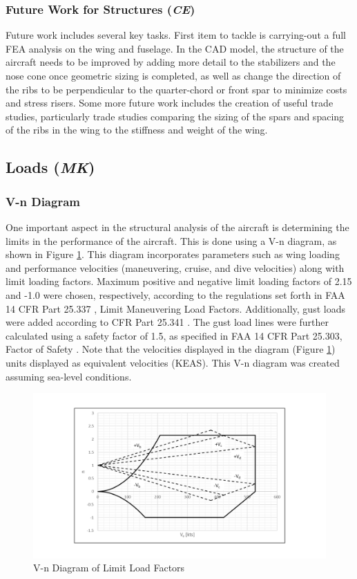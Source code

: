 \subsubsection{Future Work for Structures (\textit{CE})}
Future work includes several key tasks. First item to tackle is carrying-out a full FEA analysis on the wing and fuselage. In the CAD model, the structure of the aircraft needs to be improved by adding more detail to the stabilizers and the nose cone once geometric sizing is completed, as well as change the direction of the ribs to be perpendicular to the quarter-chord or front spar to minimize costs and stress risers. Some more future work includes the creation of useful trade studies, particularly trade studies comparing the sizing of the spars and spacing of the ribs in the wing to the stiffness and weight of the wing. 

\subsection{Loads (\textit{MK})}
\subsubsection{V-n Diagram}
\label{subvn}
One important aspect in the structural analysis of the aircraft is determining the limits in the performance of the aircraft. This is done using a V-n diagram, as shown in Figure \ref{figVN}. This diagram incorporates parameters such as wing loading and performance velocities (maneuvering, cruise, and dive velocities) along with limit loading factors. Maximum positive and negative limit loading factors of 2.15 and -1.0 were chosen, respectively, according to the regulations set forth in FAA 14 CFR Part 25.337 \cite{cfr}, Limit Maneuvering Load Factors. Additionally, gust loads were added according to CFR Part 25.341 \cite{cfr}. The gust load lines were further calculated using a safety factor of 1.5, as specified in FAA 14 CFR Part 25.303, Factor of Safety \cite{cfr}. Note that the velocities displayed in the diagram (Figure \ref{figVN}) units displayed as equivalent velocities (KEAS). This V-n diagram was created assuming sea-level conditions. 

\begin{figure}[H]
    \centering
    \includegraphics[width=\linewidth]{Photos/VN_Diagram.pdf}
    \caption{V-n Diagram of Limit Load Factors}
    \label{figVN}
\end{figure}

